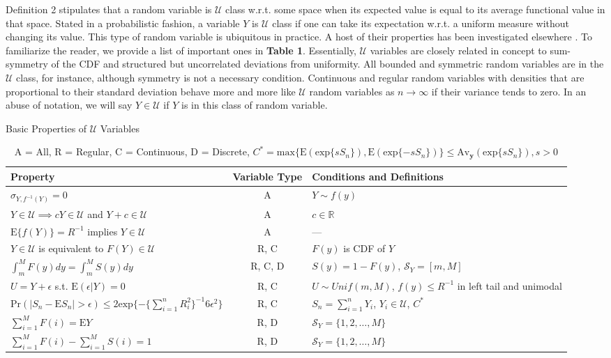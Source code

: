 \documentclass[12pt]{amsart}
\theoremstyle{plain}%
\theoremstyle{definition}
\theoremstyle{remark}
\numberwithin{equation}{section}
\begin{document}
Definition 2 stipulates that a random variable is $\mathcal{U}$ class w.r.t. some space when its expected value is equal to its average functional value in that space. Stated in a probabilistic fashion, a variable $Y$ is $\mathcal{U}$ class if one can take its expectation w.r.t. a uniform measure without changing its value. This type of random variable is ubiquitous in practice. A host of their properties has been investigated elsewhere \cite{u2023properties}. To familiarize the reader, we provide a list of important ones in \textbf{Table 1}. Essentially, $\mathcal{U}$ variables are closely related in concept to sum-symmetry of the CDF and structured but uncorrelated deviations from uniformity. All bounded and symmetric random variables are in the $\mathcal{U}$ class, for instance, although symmetry is not a necessary condition. Continuous and regular random variables with densities that are proportional to their standard deviation behave more and more like $\mathcal{U}$ random variables as $n \to \infty$ if their variance tends to zero. In an abuse of notation, we will say $Y \in \mathcal{U}$ if $Y$ is in this class of random variable.
\begin{table}[H]
\centering
\caption{Basic Properties of $\mathcal{U}$ Variables}
\begin{tabularx}{\textwidth}{p{5cm}|c| p{4cm}}
\hline
Property & Variable Type & Conditions and Definitions \\
\hline
$\sigma_{Y, f^{-1}(Y)} = 0$ & A & $Y \sim f(y)$ \\
$Y \in \mathcal{U} \implies cY \in \mathcal{U}$ and $Y + c \in \mathcal{U}$ & A & $c \in \mathbb{R}$ \\
$\text{E}\{f(Y)\} = R^{-1}$ implies $Y \in \mathcal{U}$ & A & --- \\
$Y \in \mathcal{U}$ is equivalent to $F(Y) \in \mathcal{U}$ & R, C & $F(y)$ is CDF of $Y$ \\
$\int_{m}^M F(y) dy = \int_m^M S(y) dy$ & R, C, D & $S(y) =  1-F(y)$, $\mathcal{S}_Y = [m, M]$ \\
$U = Y + \epsilon$ s.t. $\text{E}(\epsilon | Y) = 0$ & R, C & $U \sim Unif(m, M)$, $f(y) \leq R^{-1}$ in left tail and unimodal \\
$\text{Pr}(|S_n - \text{E}S_n| > \epsilon) \leq 2 \text{exp} \{ - \{ \sum_{i=1}^n R_i^2 \}^{-1} 6 \epsilon^2  \}$ & R, C & $S_n = \sum_{i=1}^n Y_i$, $Y_i \in \mathcal{U}$, $C^*$ \\
$\sum_{i =1}^M F(i) = \text{E}Y$ & R, D & $\mathcal{S}_Y = \{1, 2, \ldots, M \}$ \\
$\sum_{i =1}^M F(i) - \sum_{i =1}^M S(i) =1$ & R, D &  $\mathcal{S}_Y = \{1, 2, \ldots, M \}$ \\
\hline
\end{tabularx}
\caption*{\small A = All, R = Regular, C = Continuous, D = Discrete, $C^* = \text{max}\{ \text{E} (\text{exp} \{s S_n \} ), \text{E} (\text{exp} \{-s S_n \}) \} \leq \text{Av}_{\mathbf{y}} ( \text{exp} \{s S_n \} ), s >0$}
\end{table}
\end{document}
